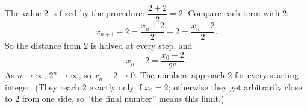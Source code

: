 The value $2$ is fixed by the procedure: $\dfrac{2+2}{2}=2$. Compare each term with $2$:
\[
x_{n+1}-2=\dfrac{x_n+2}{2}-2=\dfrac{x_n-2}{2}.
\]
So the distance from $2$ is halved at every step, and
\[
x_n-2=\dfrac{x_0-2}{2^n}.
\]
As $n\to\infty$, $2^n\to\infty$, so $x_n-2\to0$. The numbers approach $\boxed{2}$ for every starting integer. (They reach $2$ exactly only if $x_0=2$; otherwise they get arbitrarily close to $2$ from one side, so ``the final number'' means this limit.)
